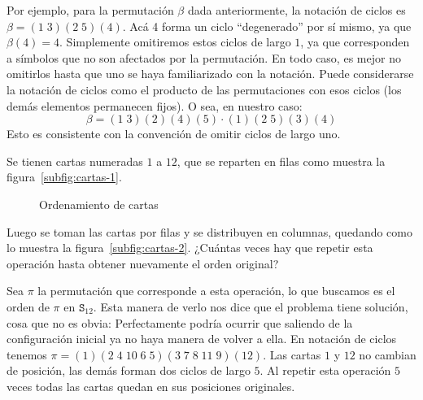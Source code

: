   Por ejemplo,
  para la permutación \(\beta\) dada anteriormente,
  la notación de ciclos es \(\beta = (1\;3) (2\;5) (4)\).
  Acá 4 forma un ciclo ``degenerado'' por sí mismo,
  ya que \(\beta(4) = 4\).
  Simplemente omitiremos estos ciclos de largo \(1\),
  ya que corresponden a símbolos
  que no son afectados por la permutación.
  En todo caso,
  es mejor no omitirlos
  hasta que uno se haya familiarizado con la notación.
  Puede considerarse la notación de ciclos
  como el producto de las permutaciones con esos ciclos
  (los demás elementos permanecen fijos).
  O sea, en nuestro caso:
  \begin{equation*}
    \beta
      = (1\;3) (2) (4) (5) \cdot (1) (2\;5) (3) (4)
  \end{equation*}
  Esto es consistente
  con la convención de omitir ciclos de largo uno.

  \begin{example}
    Se tienen cartas numeradas \(1\) a \(12\),
    que se reparten en filas
    como muestra la figura~\ref{subfig:cartas-1}.
    \begin{figure}[htbp]
      \centering
      \qquad%
      \caption{Ordenamiento de cartas}
      \label{fig:cartas}
    \end{figure}
    Luego se toman las cartas por filas
    y se distribuyen en columnas,
    quedando como lo muestra la figura~\ref{subfig:cartas-2}.
    ¿Cuántas veces hay que repetir esta operación
    hasta obtener nuevamente el orden original?

    Sea \(\pi\) la permutación que corresponde a esta operación,
    lo que buscamos es el orden de \(\pi\) en \(\mathtt{S}_{12}\).
    Esta manera de verlo
    nos dice que el problema tiene solución,
    cosa que no es obvia:
    Perfectamente podría ocurrir
    que saliendo de la configuración inicial
    ya no haya manera de volver a ella.
    En notación de ciclos
    tenemos \(\pi = (1) (2\;4\;10\;6\;5) (3\;7\;8\;11\;9) (12)\).
    Las cartas \(1\) y \(12\) no cambian de posición,
    las demás forman dos ciclos de largo \(5\).
    Al repetir esta operación \(5\) veces
    todas las cartas quedan en sus posiciones originales.
  \end{example}

